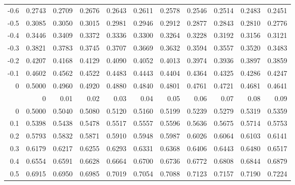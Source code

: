 \begin{center}
\begin{minipage}{5in}
\begin{center}
\begin{tabular}{|r|rrrrrrrrrr|}
\cellcolor{lightgray}	-0.6	&\cellcolor{lightgray}	0.2743	&\cellcolor{lightgray}	0.2709	&\cellcolor{lightgray}	0.2676	&\cellcolor{lightgray}	0.2643	&\cellcolor{lightgray}	0.2611	&\cellcolor{lightgray}	0.2578	&\cellcolor{lightgray}	0.2546	&\cellcolor{lightgray}	0.2514	&\cellcolor{lightgray}	0.2483	&\cellcolor{lightgray}	0.2451	\\
\cellcolor{lightgray}	-0.5	&\cellcolor{lightgray}	0.3085	&\cellcolor{lightgray}	0.3050	&\cellcolor{lightgray}	0.3015	&\cellcolor{lightgray}	0.2981	&\cellcolor{lightgray}	0.2946	&\cellcolor{lightgray}	0.2912	&\cellcolor{lightgray}	0.2877	&\cellcolor{lightgray}	0.2843	&\cellcolor{lightgray}	0.2810	&\cellcolor{lightgray}	0.2776	\\
	-0.4	&	0.3446	&	0.3409	&	0.3372	&	0.3336	&	0.3300	&	0.3264	&	0.3228	&	0.3192	&	0.3156	&	0.3121	\\
	-0.3	&	0.3821	&	0.3783	&	0.3745	&	0.3707	&	0.3669	&	0.3632	&	0.3594	&	0.3557	&	0.3520	&	0.3483	\\
	-0.2	&	0.4207	&	0.4168	&	0.4129	&	0.4090	&	0.4052	&	0.4013	&	0.3974	&	0.3936	&	0.3897	&	0.3859	\\
	-0.1	&	0.4602	&	0.4562	&	0.4522	&	0.4483	&	0.4443	&	0.4404	&	0.4364	&	0.4325	&	0.4286	&	0.4247	\\
	0	&	0.5000	&	0.4960	&	0.4920	&	0.4880	&	0.4840	&	0.4801	&	0.4761	&	0.4721	&	0.4681	&	0.4641	\\\hline
\hline 																						
		&	0	&	0.01	&	0.02	&	0.03	&	0.04	&	0.05	&	0.06	&	0.07	&	0.08	&	0.09	\\ \hline
	0	&	0.5000	&	0.5040	&	0.5080	&	0.5120	&	0.5160	&	0.5199	&	0.5239	&	0.5279	&	0.5319	&	0.5359	\\
	0.1	&	0.5398	&	0.5438	&	0.5478	&	0.5517	&	0.5557	&	0.5596	&	0.5636	&	0.5675	&	0.5714	&	0.5753	\\
	0.2	&	0.5793	&	0.5832	&	0.5871	&	0.5910	&	0.5948	&	0.5987	&	0.6026	&	0.6064	&	0.6103	&	0.6141	\\
	0.3	&	0.6179	&	0.6217	&	0.6255	&	0.6293	&	0.6331	&	0.6368	&	0.6406	&	0.6443	&	0.6480	&	0.6517	\\
	0.4	&	0.6554	&	0.6591	&	0.6628	&	0.6664	&	0.6700	&	0.6736	&	0.6772	&	0.6808	&	0.6844	&	0.6879	\\
	\cellcolor{lightgray}0.5	&\cellcolor{lightgray}	0.6915	&\cellcolor{lightgray}	0.6950	&\cellcolor{lightgray}	0.6985	&\cellcolor{lightgray}	0.7019	&\cellcolor{lightgray}	0.7054	&\cellcolor{lightgray}	0.7088	&\cellcolor{lightgray}	0.7123	&\cellcolor{lightgray}	0.7157	&\cellcolor{lightgray}	0.7190	&\cellcolor{lightgray}	0.7224	\\

\end{tabular}
\end{center}
\end{minipage}
\end{center}
